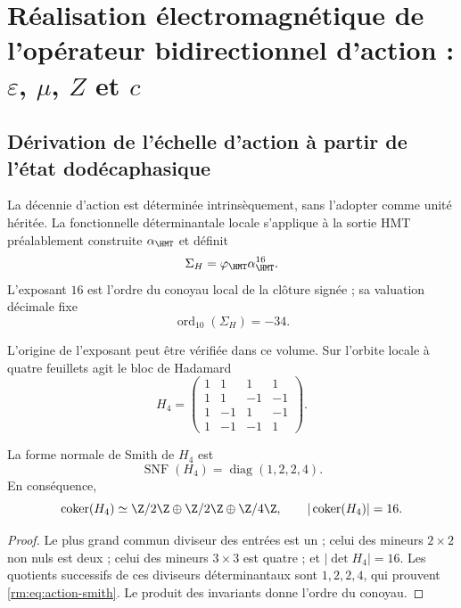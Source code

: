 \section{Réalisation électromagnétique de l’opérateur bidirectionnel d’action : \(\varepsilon\), \(\mu\), \(Z\) et \(c\)}
\label{rm:ch:vacuum}

\subsection{Dérivation de l'échelle d'action à partir de l'état dodécaphasique}

La décennie d'action est déterminée intrinsèquement, sans l'adopter comme
unité héritée. La fonctionnelle déterminantale locale s'applique à la sortie HMT
préalablement construite \(\alpha_{\HMT}\) et définit
\begin{equation}
\Sigma_H=\varphi_{\HMT}\alpha_{\HMT}^{16}.
\label{rm:eq:action-determinantal-reader}
\end{equation}
L'exposant \(16\) est l'ordre du conoyau local de la clôture signée ; sa valuation décimale fixe
\begin{equation}
\operatorname{ord}_{10}(\Sigma_H)=-34.
\label{rm:eq:action-decade}
\end{equation}

L'origine de l'exposant peut être vérifiée dans ce volume. Sur
l'orbite locale à quatre feuillets agit le bloc de Hadamard
\begin{equation}
H_4=
\begin{pmatrix}
1&1&1&1\\
1&1&-1&-1\\
1&-1&1&-1\\
1&-1&-1&1
\end{pmatrix}.
\label{rm:eq:action-hadamard}
\end{equation}

\begin{lemma}
La forme normale de Smith de \(H_4\) est
\begin{equation}
\operatorname{SNF}(H_4)=\operatorname{diag}(1,2,2,4).
\label{rm:eq:action-smith}
\end{equation}
En conséquence,
\[
\operatorname{coker}(H_4)\simeq
\Z/2\Z\oplus\Z/2\Z\oplus\Z/4\Z,
\qquad
|\operatorname{coker}(H_4)|=16.
\]
\end{lemma}

\begin{proof}
Le plus grand commun diviseur des entrées est un ; celui des mineurs
\(2\times2\) non nuls est deux ; celui des mineurs \(3\times3\) est quatre ; et
\(|\det H_4|=16\). Les quotients successifs de ces diviseurs déterminantaux
sont \(1,2,2,4\), qui prouvent \cref{rm:eq:action-smith}. Le produit des
invariants donne l'ordre du conoyau.
\end{proof}

